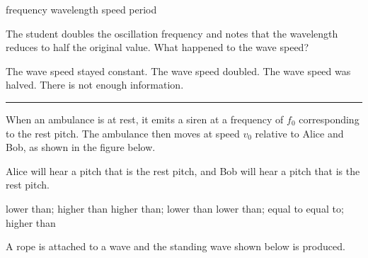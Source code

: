 \documentclass[answers]{exam}
\begin{document}
\begin{questions}
\begin{randomizeoneparchoices}
    \correctchoice frequency
    \choice wavelength
    \choice speed
    \choice period
\end{randomizeoneparchoices}

\ifprintanswers
\else
\clearpage
\fi

\question \label{Q4}
The student doubles the oscillation frequency and notes that the wavelength reduces to half the original value. What happened to the wave speed?

\begin{randomizechoices}[norandomize]
    \correctchoice The wave speed stayed constant.
    \choice The wave speed doubled.
    \choice The wave speed was halved.
    \choice There is not enough information. 
\end{randomizechoices}


\bigskip

\hrule

\question
When an ambulance is at rest, it emits a siren at a frequency of $f_0$ corresponding to the rest pitch. The ambulance then moves at speed $v_0$ relative to Alice and Bob, as shown in the figure below. 

\begin{center}
\end{center}

Alice will hear a pitch that is  the rest pitch, and Bob will hear a pitch that is  the rest pitch.

\begin{randomizechoices}
    \correctchoice lower than; \hspace{1pt} higher than
    \choice higher than; \hspace{1pt} lower than
    \choice lower than; \hspace{1pt} equal to
    \choice equal to; \hspace{1pt} higher than
\end{randomizechoices}


\question
A rope is attached to a wave and the standing wave shown below is produced.


\end{questions}
\end{document}
